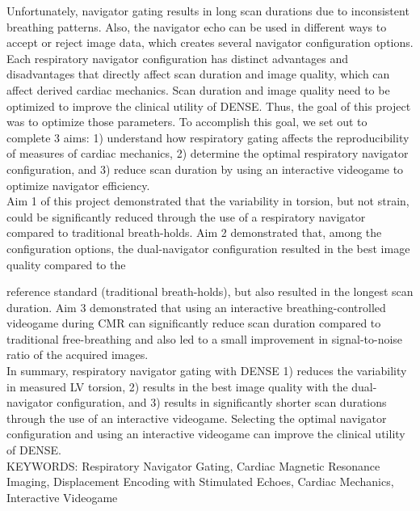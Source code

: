 Unfortunately, navigator gating results in long scan durations due to inconsistent breathing patterns. Also, the navigator echo can be used in different ways to accept or reject image data, which creates several navigator configuration options. Each respiratory navigator configuration has distinct advantages and disadvantages that directly affect scan duration and image quality, which can affect derived cardiac mechanics. Scan duration and image quality need to be optimized to improve the clinical utility of DENSE. Thus, the goal of this project was to optimize those parameters. To accomplish this goal, we set out to complete 3 aims: 1) understand how respiratory gating affects the reproducibility of measures of cardiac mechanics, 2) determine the optimal respiratory navigator configuration, and 3) reduce scan duration by using an interactive videogame to optimize navigator efficiency.\\

Aim 1 of this project demonstrated that the variability in torsion, but not strain, could be significantly reduced through the use of a respiratory navigator compared to traditional breath-holds. Aim 2 demonstrated that, among the configuration options, the dual-navigator configuration resulted in the best image quality compared to the

\restoregeometry
\thispagestyle{empty} %

\noindent reference standard (traditional breath-holds), but also resulted in the longest scan duration. Aim 3 demonstrated that using an interactive breathing-controlled videogame during CMR can significantly reduce scan duration compared to traditional free-breathing and also led to a small improvement in signal-to-noise ratio of the acquired images. \\

In summary, respiratory navigator gating with DENSE 1) reduces the variability in measured LV torsion, 2) results in the best image quality with the dual-navigator configuration, and 3) results in significantly shorter scan durations through the use of an interactive videogame. Selecting the optimal navigator configuration and using an interactive videogame can improve the clinical utility of DENSE.\\

\noindent KEYWORDS: Respiratory Navigator Gating, Cardiac Magnetic Resonance Imaging, Displacement Encoding with Stimulated Echoes, Cardiac Mechanics, Interactive Videogame

\vspace{5.03125in}        %
					



